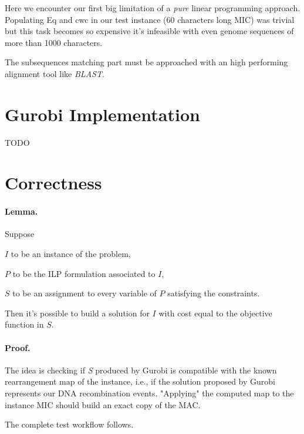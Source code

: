 Here we encounter our first big limitation of a \textit{pure} linear programming approach. Populating Eq and cwc in our test instance (60 characters long MIC) was trivial but this task becomes so expensive it's infeasible with even genome sequences of more than 1000 characters.

The subsequences matching part must be approached with an high performing alignment tool like \textit{BLAST}.

\section{Gurobi Implementation}
TODO

\section{Correctness}

\paragraph{Lemma.}
Suppose

$I$ to be an instance of the problem,

$P$ to be the ILP formulation associated to $I$,

$S$ to be an assignment to every variable of $P$ satisfying the constraints.

Then it's possible to build a solution for $I$ with cost equal to the objective function in $S$.

\paragraph{Proof.}
The idea is checking if \textit{S} produced by Gurobi is compatible with the known rearrangement map of the instance, i.e., if the solution proposed by Gurobi represents our DNA recombination events. "Applying" the computed map to the instance MIC should build an exact copy of the MAC.

The complete test workflow follows.

